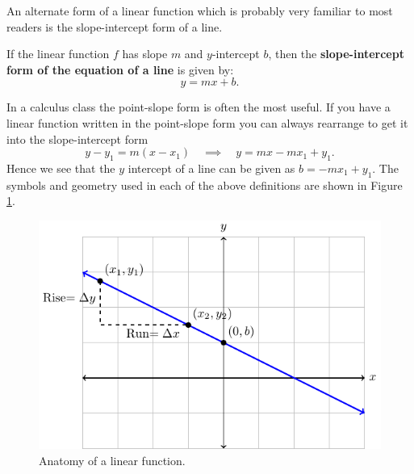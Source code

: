 An alternate form of a linear function which is probably very familiar to most readers is
the slope-intercept form of a line.
\begin{definition}
If the linear function $f$ has slope $m$ and $y$-intercept $b$, then the
{\bf slope-intercept form of the equation of a line} is given by: 
\[ y=mx + b.  \]
\end{definition}
In a calculus class the point-slope form is often the most useful.  If you have a linear
function written in the point-slope form you can always rearrange to get it into the
slope-intercept form
\[ y - y_1 = m(x-x_1) \quad \implies \quad y = mx - m x_1 + y_1. \]
Hence we see that the $y$ intercept of a line can be given as $b = -mx_1 + y_1$.
The
symbols and geometry used in each of the above definitions are shown in Figure
\ref{fig:0.1.linear_fn}.

\begin{figure}[ht!]
    \centering
    \includegraphics[width=0.6\columnwidth]{figures/0-1-fig4.pdf}
    \caption{Anatomy of a linear function.}
    \label{fig:0.1.linear_fn}
\end{figure}


